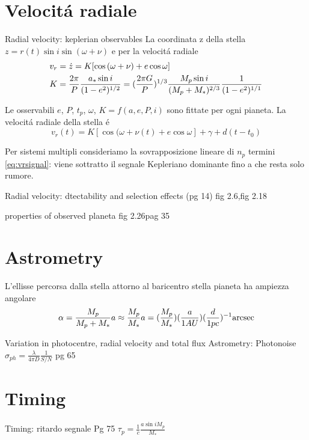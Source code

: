
\section{Velocit\'a radiale}
\begin{workout}{Radial velocity: keplerian observables}
La coordinata z della stella $z=r(t)\sin{i}\sin{(\omega+\nu)}$ e per la velocit\'a radiale
\begin{align}
&v_r=\dot{z}=K[\cos{(\omega+\nu)}+e\cos{\omega}]\label{eq:vrsignal}\\
&K=\frac{2\pi}{P}\frac{a_*\sin{i}}{(1-e^2)\expy{1/2}}=(\frac{2\pi G}{P})\expy{1/3}\frac{M_p\sin{i}}{(M_p+M_*)\expy{2/3}}\frac{1}{(1-e^2)\expy{1/1}}
\end{align}

Le osservabili $e$, $P$, $t_p$, $\omega$, $K=f(a,e,P,i)$ sono fittate per ogni pianeta.
La velocit\'a radiale della stella \'e
\begin{equation}
v_r(t)=K[\cos{(\omega+\nu(t)}+e\cos{\omega}]+\gamma+d(t-t_0)
\end{equation}
\end{workout}
Per sistemi multipli consideriamo la sovrapposizione lineare di $n_p$ termini \eqref{eq:vrsignal}: viene sottratto il segnale Kepleriano dominante fino a che resta solo rumore.
\begin{workout}{Radial velocity: dtectability and selection effects (pg 14)}
fig 2.6,fig 2.18
\end{workout}
\begin{workout}{properties of observed planeta}
fig 2.26pag 35
\end{workout}
\section{Astrometry}
L'ellisse percorsa dalla stella attorno al baricentro stella pianeta ha ampiezza angolare
\begin{equation}
\alpha=\frac{M_p}{M_p+M_*}a\approx\frac{M_p}{M_*}a=(\frac{M_p}{M_*})(\frac{a}{1AU})(\frac{d}{1pc})\expy{-1}\si{\arcsec}
\end{equation}

\begin{workout}{Variation in photocentre, radial velocity and total flux}
Astrometry: Photonoise $\sigma_{ph}=\frac{\lambda}{4\pi D}\frac{1}{S/N}$
pg 65
\end{workout}

\section{Timing}
\begin{workout}{Timing: ritardo segnale}
Pg 75
$\tau_p=\frac{1}{c}\frac{a\sin{i}M_p}{M_*}$
\end{workout}
